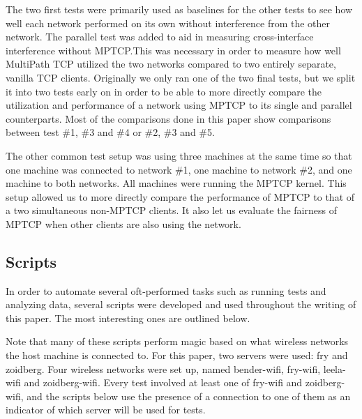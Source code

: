 \documentclass[12pt,a4paper]{article}
\begin{document}
The two first tests were primarily used as baselines for the other tests to see
how well each network performed on its own without interference from the other
network. The parallel test was added to aid in measuring cross-interface
interference without MPTCP.\@ This was necessary in order to measure how well
MultiPath TCP utilized the two networks compared to two entirely separate,
vanilla TCP clients. Originally we only ran one of the two final tests, but we
split it into two tests early on in order to be able to more directly compare
the utilization and performance of a network using MPTCP to its single and
parallel counterparts. Most of the comparisons done in this paper show
comparisons between test \#1, \#3 and \#4 or \#2, \#3 and \#5.

The other common test setup was using three machines at the same time so that
one machine was connected to network \#1, one machine to network \#2, and one
machine to both networks. All machines were running the MPTCP kernel. This setup
allowed us to more directly compare the performance of MPTCP to that of a two
simultaneous non-MPTCP clients. It also let us evaluate the fairness of MPTCP
when other clients are also using the network.

\subsection{Scripts}
In order to automate several oft-performed tasks such as running tests and
analyzing data, several scripts were developed and used throughout the writing
of this paper. The most interesting ones are outlined below.

Note that many of these scripts perform magic based on what wireless networks
the host machine is connected to. For this paper, two servers were used: fry and
zoidberg. Four wireless networks were set up, named bender-wifi, fry-wifi,
leela-wifi and zoidberg-wifi. Every test involved at least one of fry-wifi and
zoidberg-wifi, and the scripts below use the presence of a connection to one of
them as an indicator of which server will be used for tests.
\end{document}
